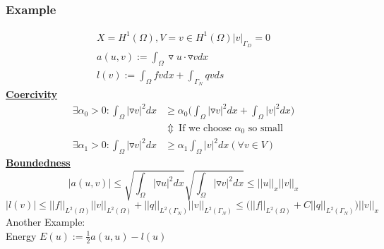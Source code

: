 \documentclass[a4paper,12pt]{article}
\begin{document}
\subsubsection{Example}
\begin{equation}\nonumber
\begin{aligned}
X=H^1(\Omega), V={v \in H^1(\Omega)|v|_{\Gamma_D}=0}\\
a(u,v) := \int_\Omega \triangledown u \cdot \triangledown v dx\\
l(v) := \int_\Omega fv dx + \int_{\Gamma_N} qv ds
\end{aligned}
\end{equation}
\underline{\textbf{Coercivity}}\\
\begin{equation}\nonumber
\begin{aligned}
\exists \alpha_0 > 0: \int_\Omega |\triangledown v|^2 dx &\geq \alpha_0 \bigg( \int_\Omega |\triangledown v|^2 dx + \int_\Omega |v|^2 dx \bigg)\\
&\Updownarrow\ \text{If we choose $\alpha_0$ so small}\\
\exists \alpha_1 > 0 : \int_\Omega |\triangledown v|^2 dx &\geq \alpha_1 \int_\Omega |v|^2 dx (\forall v \in V)
\end{aligned}
\end{equation}
\underline{\textbf{Boundedness}}\\
\begin{equation}\nonumber
|a(u,v)| \leq \sqrt{\int_\Omega |\triangledown u|^2 dx} \sqrt{\int_\Omega |\triangledown v|^2 dx} \leq ||u||_x ||v||_x
\end{equation}
\begin{equation}\nonumber
|l(v)| \leq ||f||_{L^2(\Omega)} ||v||_{L^2(\Omega)} + ||q||_{L^2(\Gamma_N)} ||v||_{L^2(\Gamma_N)} \leq \bigg( ||f||_{L^2(\Omega)} + C||q||_{L^2(\Gamma_N)}\bigg)||v||_x
\end{equation}
Another Example:\\
Energy $E(u) := \frac{1}{2} a(u,u) - l(u)$
\end{document}
